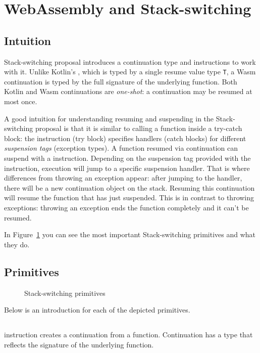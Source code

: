 \section{WebAssembly and Stack-switching}
\label{sec:webassembly}

\subsection{Intuition}

Stack-switching proposal introduces a continuation type and instructions to work with it.
Unlike Kotlin's , which is typed by a single resume value type \texttt{T}, a Wasm continuation
is typed by the full signature of the underlying function. Both Kotlin and Wasm continuations are \textit{one-shot}:
a continuation may be resumed at most once.

A good intuition for understanding resuming and suspending in the Stack-switching proposal is that it is similar to
calling a function inside a try-catch block: the \wasmresume instruction (try block) specifies handlers (catch blocks) for
different \textit{suspension tags} (exception types). A function resumed via continuation can suspend with a \wasmsuspend
instruction. Depending on the suspension tag provided with the \wasmsuspend instruction, execution will jump to a
specific suspension handler. That is where differences from throwing an exception appear:
after jumping to the handler, there will be a new continuation object on the stack. Resuming this continuation will
resume the function that has just suspended. This is in contrast to throwing exceptions: throwing
an exception ends the function completely and it can't be resumed.

In Figure~\ref{fig:stack-switching-primitives} you can see the most important Stack-switching primitives and what they
do.

\subsection{Primitives}
\begin{figure}[H]
    \centering
    
    \caption{Stack-switching primitives}
    \label{fig:stack-switching-primitives}
\end{figure}

Below is an introduction for each of the depicted primitives.

\subsection*{\contnew}
\contnew instruction creates a continuation from a function. Continuation has a type that reflects the signature of the
underlying function.

